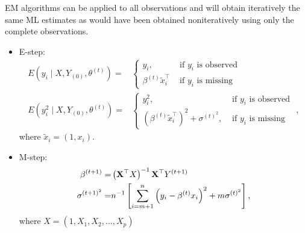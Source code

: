 \begin{example}
	EM algorithms can be applied to all observations and will obtain iteratively the same ML estimates as would have been obtained noniteratively using only the complete observations.

	\begin{itemize}
		\item E-step:
		      \begin{equation}
			      \begin{aligned}
				      E\left(y_{i} \mid X, Y_{(0)}, \theta^{(t)}\right)=     & \left\{\begin{array}{ll}
					                                                                      y_{i},                           & \text { if } y_{i} \text { is observed } \\
					                                                                      \beta^{(t)} \tilde{x}_{i}^{\top} & \text { if } y_{i} \text { is missing }
				                                                                      \end{array}\right.                                                                                      \\
				      E\left(y_{i}^{2} \mid X, Y_{(0)}, \theta^{(t)}\right)= & \left\{\begin{array}{ll}
					                                                                      y_{i}^{2},                                                          & \text { if } y_{i} \text { is observed } \\
					                                                                      \left(\beta^{(t)} \tilde{x}_{i}^{\top}\right)^{2}+\sigma^{(t)^{2}}, & \text { if } y_{i} \text { is missing }
				                                                                      \end{array}\right.,
			      \end{aligned}
		      \end{equation}
		      where $\tilde{x}_{i}=(1,x_{i})$.
		\item M-step:
		      \begin{equation}
			      \begin{aligned}
				      \beta^{(t+1)}=      & \left({\bf X}^{\top} X\right)^{-1} {\bf X}^{\top} Y^{(t+1)}                                           \\
				      \sigma^{(t+1)^{2}}= & n^{-1}\left[\sum_{i=m+1}^{n}\left(y_{i}-\beta^{(t)} x_{i}\right)^{2}+m \sigma^{(t)^{2}}\right],
			      \end{aligned}
		      \end{equation}
		      where $X=(1,X_1,X_2,\ldots,X_p)$
	\end{itemize}
\end{example}

